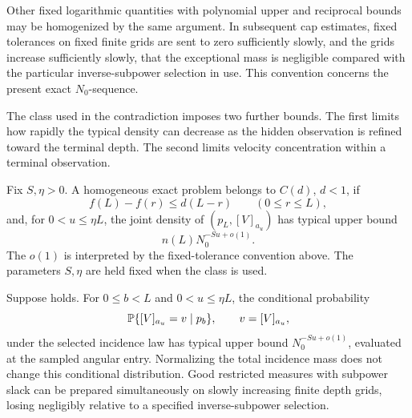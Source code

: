 Other fixed logarithmic quantities with polynomial upper and
reciprocal bounds may be homogenized by the same argument.
In subsequent cap estimates, fixed tolerances on fixed finite
grids are sent to zero sufficiently slowly, and the grids
increase sufficiently slowly, that the exceptional mass is
negligible compared with the particular inverse-subpower
selection in use.  This convention concerns the present exact
\(N_0\)-sequence.

The class used in the contradiction imposes two further bounds.
The first limits how rapidly the typical density can decrease
as the hidden observation is refined toward the terminal depth.
The second limits velocity concentration within a terminal
observation.

\begin{definition}\label{a01:cap-class}
Fix \(S,\eta>0\).  A homogeneous exact problem belongs to \(C(d)\),
\(d<1\), if
\begin{equation}
 f(L)-f(r)\le d(L-r)\qquad(0\le r\le L),
 \label{a01:endpoint-cap}
\end{equation}
and, for \(0<u\le\eta L\), the joint density of
\((p_L,[V]_{a_u})\) has typical upper bound
\begin{equation}
 n(L)N_0^{-Su+o(1)}.
 \label{a01:angular-cap}
\end{equation}
The \(o(1)\) is interpreted by the fixed-tolerance convention above.
The parameters \(S,\eta\) are held fixed when the class is used.
\end{definition}

\begin{lemma}\label{a01:angular-coarsening}
Suppose  holds. For \(0\le b<L\) and
\(0<u\le\eta L\), the conditional probability
\[
 \mathbb P\{[V]_{a_u}=v\mid p_b\},
 \qquad v=[V]_{a_u},
\]
under the selected incidence law has typical upper bound
\(N_0^{-Su+o(1)}\), evaluated at the sampled angular entry.
Normalizing the total incidence mass does not change this
conditional distribution. Good restricted measures with subpower
slack can be prepared simultaneously on slowly increasing finite
depth grids, losing negligibly relative to a specified
inverse-subpower selection.
\end{lemma}

